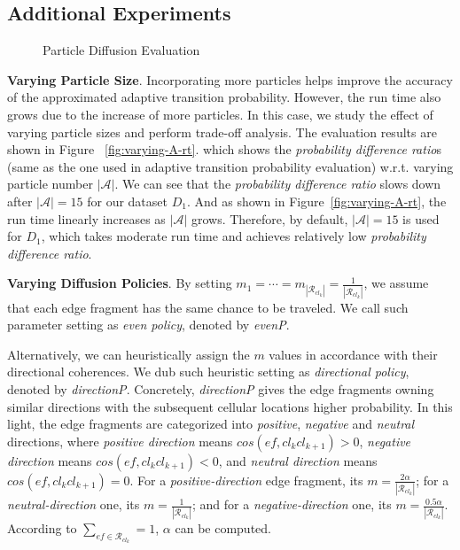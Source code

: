 \documentclass{vldb}
\begin{document}
	
	\subsection{Additional Experiments}
	
	\begin{figure}
		\vspace{-10pt}
		\caption{Particle Diffusion Evaluation}
		\label{fig:particle-filter}
		\vspace{-12pt}
	\end{figure}
	
	
	\textbf{Varying Particle Size}.
	Incorporating more particles helps improve the accuracy of the approximated adaptive transition probability.
	However, the run time also grows due to the increase of more particles.
	In this case, we study the effect of varying particle sizes and perform trade-off analysis.
	The evaluation results are shown in Figure%
	~\ref{fig:varying-A-rt}.
	which shows the {\em probability difference ratio}s (same as the one used in adaptive transition probability evaluation) w.r.t. varying particle number $|\mathcal{A}|$.
	We can see that the {\em probability difference ratio} slows down after $|\mathcal{A}|=15$ for our dataset $D_1$.
	And as shown in Figure~\ref{fig:varying-A-rt}, the run time linearly increases as $|\mathcal{A}|$ grows.
	Therefore, by default, $|\mathcal{A}|=15$ is used for $D_1$, which takes moderate run time and achieves relatively low {\em probability difference ratio}.
	
	\textbf{Varying Diffusion Policies}. 
	By setting $m_1=\cdots=m_{|\mathcal{R}_{cl_k}|}=\frac{1}{|\mathcal{R}_{cl_k}|}$, we assume that each edge fragment has the same chance to be traveled. 
	We call such parameter setting as {\em even policy}, denoted by {\em evenP}.
	
	Alternatively, we can heuristically assign the $m$ values in accordance with their directional coherences.
	We dub such heuristic setting as {\em directional policy}, denoted by {\em directionP}.
	Concretely, {\em directionP} gives the edge fragments owning similar directions with the subsequent cellular locations higher probability.
	In this light, the edge fragments are categorized into {\em positive}, {\em negative} and {\em neutral} directions,
	where {\em positive direction} means $cos(ef,cl_k cl_{k+1})>0$, {\em negative direction} means $cos(ef, cl_k cl_{k+1})<0$, and {\em neutral direction} means $cos(ef, cl_k cl_{k+1})=0$.
	For a {\em positive-direction} edge fragment, its $m=\frac{2\alpha}{|\mathcal{R}_{cl_k}|}$; for a {\em neutral-direction} one, its $m=\frac{1}{|\mathcal{R}_{cl_k}|}$; and for a {\em negative-direction} one, its $m=\frac{0.5\alpha}{|\mathcal{R}_{cl_k}|}$.
	According to $\sum_{ef\in \mathcal{R}_{cl_k}}=1$, $\alpha$ can be computed.
	
\end{document}
